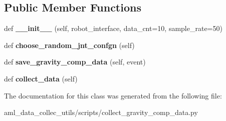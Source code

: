 \subsection*{Public Member Functions}
\begin{DoxyCompactItemize}
\item 
\hypertarget{classscripts_1_1collect__gravity__comp__data_1_1_collect_gravity_comp_data_ac59a395138aef9b4c6b299eae0b973cf}{}\label{classscripts_1_1collect__gravity__comp__data_1_1_collect_gravity_comp_data_ac59a395138aef9b4c6b299eae0b973cf} 
def {\bfseries \+\_\+\+\_\+init\+\_\+\+\_\+} (self, robot\+\_\+interface, data\+\_\+cnt=10, sample\+\_\+rate=50)
\item 
\hypertarget{classscripts_1_1collect__gravity__comp__data_1_1_collect_gravity_comp_data_a5bbbfd37bc8de83b7b1c05fd04d18033}{}\label{classscripts_1_1collect__gravity__comp__data_1_1_collect_gravity_comp_data_a5bbbfd37bc8de83b7b1c05fd04d18033} 
def {\bfseries choose\+\_\+random\+\_\+jnt\+\_\+confgn} (self)
\item 
\hypertarget{classscripts_1_1collect__gravity__comp__data_1_1_collect_gravity_comp_data_a4c507f0db34276add5fba13a27b20d2f}{}\label{classscripts_1_1collect__gravity__comp__data_1_1_collect_gravity_comp_data_a4c507f0db34276add5fba13a27b20d2f} 
def {\bfseries save\+\_\+gravity\+\_\+comp\+\_\+data} (self, event)
\item 
\hypertarget{classscripts_1_1collect__gravity__comp__data_1_1_collect_gravity_comp_data_a27cb410f0fb3cbba3bab6d23b4f35dd8}{}\label{classscripts_1_1collect__gravity__comp__data_1_1_collect_gravity_comp_data_a27cb410f0fb3cbba3bab6d23b4f35dd8} 
def {\bfseries collect\+\_\+data} (self)
\end{DoxyCompactItemize}


The documentation for this class was generated from the following file\+:\begin{DoxyCompactItemize}
\item 
aml\+\_\+data\+\_\+collec\+\_\+utils/scripts/collect\+\_\+gravity\+\_\+comp\+\_\+data.\+py\end{DoxyCompactItemize}
